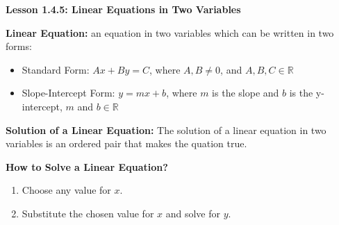 \begin{center}
\textbf{Lesson 1.4.5: Linear Equations in Two Variables}
\end{center}


\textbf{Linear Equation:} an equation in two variables which can be written in two forms: 
\begin{itemize} 
\item Standard Form: $ Ax+By=C $, where $ A, B \neq 0$, and $ A, B, C \in \mathbb{R} $
\item Slope-Intercept Form: $ y=mx+b $, where $ m $ is the slope and $ b $ is the y-intercept, $ m $ and $ b \in\mathbb{R} $ 
\end{itemize} 

\textbf{Solution of a Linear Equation:} The solution of a linear equation in two variables is an ordered pair that makes the quation true.

\textbf{How to Solve a Linear Equation?}
	\begin{enumerate}
		\item Choose any value for $ x $.
		\item Substitute the chosen value for $ x $ and solve for $ y $.
	\end{enumerate}
